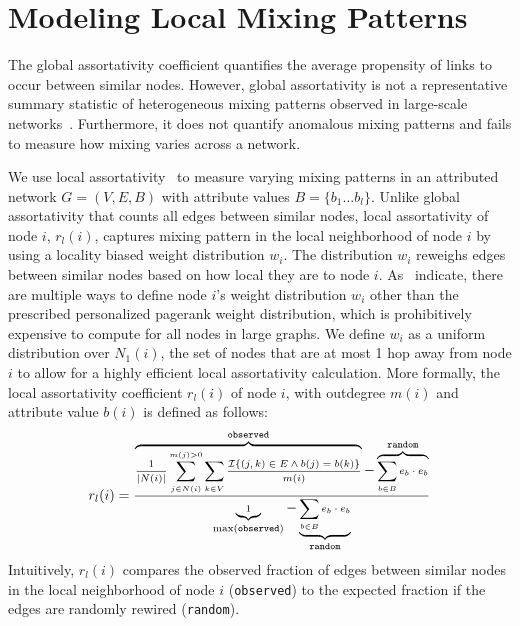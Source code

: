 \section{Modeling Local Mixing Patterns}
\label{subsec:LocalMixing}

The global assortativity coefficient quantifies
the average propensity of links to occur between similar nodes.
However, global assortativity is not a representative summary statistic of
heterogeneous mixing patterns observed in large-scale networks~\cite{peel2018multiscale}.
Furthermore, it does not quantify anomalous mixing patterns and fails to measure how mixing varies across a network.

We use local assortativity~\cite{peel2018multiscale} to measure varying
mixing patterns in an attributed network $G=(V,E,B)$ with attribute values $B=\{b_1...b_l\}$.
Unlike global assortativity that counts all edges between similar nodes, local assortativity
of node $i$, $r_l(i)$, captures mixing pattern in the local neighborhood of node
$i$ by using a locality biased weight distribution $w_i$. The distribution
$w_i$ reweighs edges between similar nodes based on how local they are to
node $i$.
As~\citet{peel2018multiscale} indicate, there are multiple ways
to define node $i$'s weight distribution $w_i$ other than the prescribed
personalized pagerank weight distribution, which is prohibitively expensive to compute
for all nodes in large graphs.
We define $w_i$ as a uniform distribution over $N_1(i)$, the set of nodes that
are at most 1 hop away from node $i$ to allow for a highly efficient
local assortativity calculation.
More formally, the local assortativity coefficient $r_l(i)$ of node $i$, with outdegree $m(i)$ and
attribute value $b(i)$ is defined as follows:
\begin{align*}
	\scriptsize r_l(i) = \frac{\overbrace{\frac{1}{|N(i)|}\sum\limits_{j \in N(i)}^{m(j) > 0} \sum_{k \in V} \frac{\mathcal{I}\{(j,k) \in E \wedge b(j)=b(k)\}}{m(i)} }^{\texttt{observed}}-\overbrace{\sum_{b \in B} e_{b}\cdot e_{b}}^{\texttt{random}}}{\underbrace{1}_{\max(\texttt{observed})}-\underbrace{\sum_{b \in B} e_{b} \cdot e_{b}}_\texttt{random}}
\end{align*}
Intuitively, $r_l(i)$ compares the observed fraction of edges between similar nodes
in the local neighborhood of node $i$ (\texttt{observed}) to the expected fraction
if the edges are randomly rewired (\texttt{random}).

